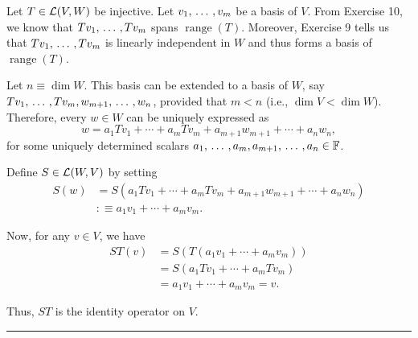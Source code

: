 \begin{prf} %
  \Rightarrowdirection Let $T \in \mathcal{L} (V,W)$ be injective. Let $v_1, {\, \ldots \,\,}, v_m$ be a basis of $V$. From Exercise 10, we know that $T v_1, {\, \ldots \,\,}, T v_m$ spans $\operatorname{range}(T)$. Moreover, Exercise 9 tells us that $T v_1, {\, \ldots \,\,}, T v_m$ is linearly independent in $W$ and thus forms a basis of $\operatorname{range}(T)$.

  Let $n \equiv \dim W$. This basis can be extended to a basis of $W$, say $T v_1, {\, \ldots \,\,}, T v_m, w_{m+1}, {\, \ldots \,\,}, w_n$, provided that $m < n$ (i.e., $\dim V < \dim W$). Therefore, every $w \in W$ can be uniquely expressed as
  \begin{equation}
    w = a_1 T v_1 + \cdots + a_m T v_m + a_{m+1} w_{m+1} + \cdots + a_{n} w_n,
  \end{equation}
  for some uniquely determined scalars $a_1, {\, \ldots \,\,}, a_m, a_{m+1}, {\, \ldots \,\,}, a_n \in \mathbb{F}$.

  Define $S \in \mathcal{L}(W,V)$ by setting
  \begin{equation}
    \begin{aligned}
      S(w) &= S(a_1 T v_1 + \cdots + a_m T v_m + a_{m+1} w_{m+1} + \cdots + a_{n} w_n)  \\
      &:\equiv a_1 v_1 + \cdots + a_m v_m.
    \end{aligned}
  \end{equation}

  Now, for any $v \in V$, we have
  \begin{equation}
    \begin{aligned}
      ST(v) &= S(T(a_1 v_1 + \cdots + a_m v_m)) \\
      &= S(a_1 T v_1 + \cdots + a_m T v_m) \\
      &= a_1 v_1 + \cdots + a_m v_m = v.
    \end{aligned}
  \end{equation}

  Thus, $ST$ is the identity operator on $V$.
\end{prf}

\hrule

